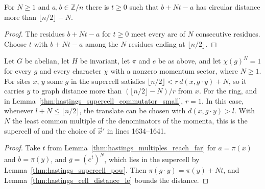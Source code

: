 \begin{lemma}
    \label{thm:hastings_multiples_reach_far}
    \leanok
    For $N\ge1$ and $a,b\in\mathbb{Z}/n$ there is $t\ge0$ such that $b+Nt-a$
    has circular distance more than $\lfloor n/2\rfloor-N$.
\end{lemma}
\begin{proof}\leanok
    The residues $b+Nt-a$ for $t\ge0$ meet every arc of $N$ consecutive
    residues. Choose $t$ with $b+Nt-a$ among the $N$ residues ending at
    $\lfloor n/2\rfloor$.
\end{proof}

\begin{lemma}
    \label{thm:hastings_supercell_far}
    \leanok
    Let $G$ be abelian, let $H$ be invariant, let $\pi$ and $e$ be as above, and
    let $\chi(g)^N=1$ for every $g$ and every character $\chi$ with a nonzero
    momentum sector, where $N\ge1$. For sites $x$, $y$ some $g$ in the supercell
    satisfies $\lfloor n/2\rfloor<r\,d(x,g\cdot y)+N$, so it carries $y$ to
    graph distance more than $(\lfloor n/2\rfloor-N)/r$ from $x$. For the ring,
    and in Lemma~\ref{thm:hastings_supercell_commutator_small}, $r=1$. In this case, whenever
    $l+N\le\lfloor n/2\rfloor$, the translate can be chosen with
    $d(x,g\cdot y)>l$. With $N$ the least common multiple of the
    denominators of the momenta, this is the supercell
    of \cite[lines 1620--1630]{Hastings2006Solving} and the choice of
    $\vec x'$ in lines 1634--1641.
\end{lemma}
\begin{proof}\leanok
    Take $t$ from Lemma~\ref{thm:hastings_multiples_reach_far} for $a=\pi(x)$ and
    $b=\pi(y)$, and $g=(e^t)^N$, which lies in the supercell by
    Lemma~\ref{thm:hastings_supercell_pow}. Then $\pi(g\cdot y)=\pi(y)+Nt$, and
    Lemma~\ref{thm:hastings_cell_distance_le} bounds the distance.
\end{proof}

